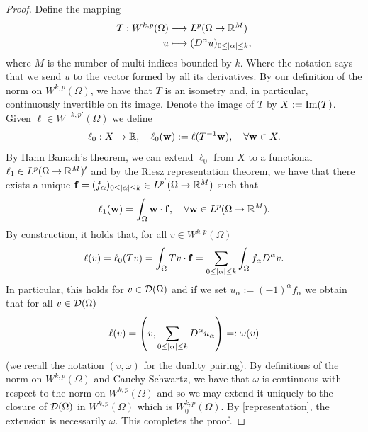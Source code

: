 \documentclass[
    a4paper,
    DIV=14,
    abstract=true,
    numbers=noenddot
]{scrartcl}
\begin{document}
\begin{proof}
    Define the mapping
    \begin{align*}
        T: W^{k,p}(\Omega ) & \longrightarrow L^p(\Omega \to \R^M)                \\
        u                   & \longmapsto(D^\alpha u)_{0 \leq\abs{\alpha}\leq k},
    \end{align*}
    where $M$ is the number of multi-indices bounded by $k$.
    Where the notation says that we send $u$ to the vector formed by all its derivatives. By our definition of the norm on $W^{k,p}(\Omega )$, we have that $T$ is an isometry and, in particular, continuously invertible on its image. Denote the image of $T$ by $X:=\rm{Im}(T)$. Given $\ell \in W^{-k,p'}(\Omega )$ we define
    \begin{align*}
        \ell_0: X \to \R, \quad \ell_0(\mathbf{w}):= \ell(T^{-1}\mathbf{w}), \quad \forall \mathbf{w} \in X.
    \end{align*}
    By Hahn Banach's theorem, we can extend $\ell_0$ from $X$ to a functional $\ell_1 \in  L^p(\Omega \to \R^M)'$ and by the Riesz representation theorem, we have that there exists a unique $\mathbf{f}=(f_\alpha)_{0\leq \abs{\alpha}\leq k }\in L^{p'}(\Omega \to \R^M)$ such that
    \begin{align*}
        \ell_1(\mathbf{w})=\int_{\Omega}\mathbf{w}\cdot \mathbf{f}, \quad \forall \mathbf{w} \in L^p(\Omega \to \R^M).
    \end{align*}
    By construction, it holds that, for all $v \in W^{k,p}(\Omega )$
    \begin{align*}
        \ell(v)=\ell_0(Tv)=\int_{\Omega}Tv\cdot \mathbf{f}=\sum_{0\leq\abs{\alpha}\leq k}\int_{\Omega}f_\alpha D^\alpha v .
    \end{align*}
    In particular, this holds for $v \in \Dd(\Omega )$ and if we set $u_\alpha:=(-1)^\alpha f_\alpha$ we obtain that for all $v \in \Dd(\Omega )$
    \begin{align}\label{representation}
        \ell(v)=\left(v,\sum_{0\leq\abs{\alpha}\leq k} D^\alpha u_\alpha\right)=: \omega(v)
    \end{align}
    (we recall the notation $(v,\omega)$ for the duality pairing). By definitions of the norm on $W^{k,p}(\Omega )$ and Cauchy Schwartz, we have that $\omega$ is continuous with respect to the norm on $W^{k,p}(\Omega )$ and so we may extend it uniquely to the closure of $\Dd(\Omega )$ in $W^{k,p}(\Omega )$ which is $W^{k,p}_0(\Omega )$. By \eqref{representation}, the extension is necessarily $\omega$. This completes the proof.
\end{proof}
\end{document}

